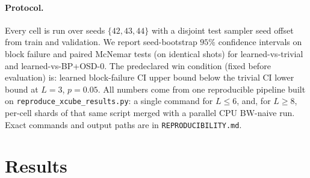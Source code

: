 \documentclass[11pt,a4paper]{article}
\begin{document}
\paragraph{Protocol.} Every cell is run over seeds $\{42,43,44\}$ with a
disjoint test sampler seed offset from train and validation. We report
seed-bootstrap $95\%$ confidence intervals on block failure and paired
McNemar tests (on identical shots) for learned-vs-trivial and
learned-vs-BP+OSD-0. The predeclared win condition (fixed before evaluation)
is: learned block-failure CI upper bound below the trivial CI lower bound
at $L=3$, $p=0.05$. All numbers come from one reproducible pipeline built on
\texttt{reproduce\_xcube\_results.py}: a single command for $L\le 6$, and, for
$L\ge 8$, per-cell shards of that same script merged with a parallel CPU
BW-naive run. Exact commands and output paths are in
\texttt{REPRODUCIBILITY.md}.

\section{Results}
\label{sec:results}
\end{document}

